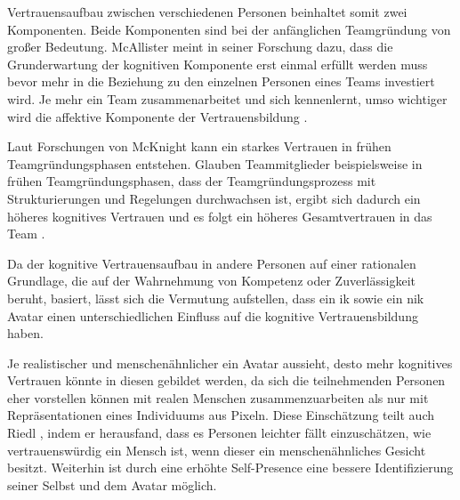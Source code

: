 \documentclass[a4paper,11pt]{article}%
\renewcommand{\\}{\vspace*{0.5\baselineskip} \newline}
\begin{document}
Vertrauensaufbau zwischen verschiedenen Personen beinhaltet somit zwei Komponenten. Beide Komponenten sind bei der anfänglichen Teamgründung von großer Bedeutung. 
McAllister meint in seiner Forschung dazu, dass die Grunderwartung der kognitiven Komponente erst einmal erfüllt werden muss bevor mehr in die Beziehung zu den einzelnen Personen eines Teams investiert wird. Je mehr ein Team zusammenarbeitet und sich kennenlernt, umso wichtiger wird die affektive Komponente der Vertrauensbildung \citep[p.30]{mcallister1995affect}.

Laut Forschungen von McKnight kann ein starkes Vertrauen in frühen Teamgründungsphasen entstehen. Glauben Teammitglieder beispielsweise in frühen Teamgründungsphasen, dass der Teamgründungsprozess mit Strukturierungen und Regelungen durchwachsen ist, ergibt sich dadurch ein höheres kognitives Vertrauen und es folgt ein höheres Gesamtvertrauen in das Team \citep[p.478-479]{mcknight1998initial}.

Da der kognitive Vertrauensaufbau in andere Personen auf einer rationalen Grundlage, die auf der Wahrnehmung von Kompetenz oder Zuverlässigkeit beruht, basiert, lässt sich die Vermutung aufstellen, dass ein \ac{ik} sowie ein \ac{nik} Avatar einen unterschiedlichen Einfluss auf die kognitive Vertrauensbildung haben.

Je realistischer und menschenähnlicher ein Avatar aussieht, desto mehr kognitives Vertrauen könnte in diesen gebildet werden, da sich die teilnehmenden Personen eher vorstellen können mit realen Menschen zusammenzuarbeiten als nur mit Repräsentationen eines Individuums aus Pixeln. Diese Einschätzung teilt auch Riedl \cite{riedl2014trusting}, indem er herausfand, dass es Personen leichter fällt einzuschätzen, wie vertrauenswürdig ein Mensch ist, wenn dieser ein menschenähnliches Gesicht besitzt.
Weiterhin ist durch eine erhöhte Self-Presence eine bessere Identifizierung seiner Selbst und dem Avatar möglich. 

\end{document}

